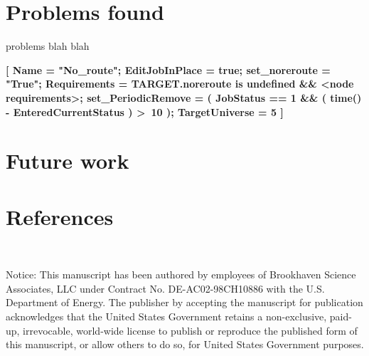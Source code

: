 \documentclass[a4paper]{jpconf}
\begin{document}
\section{Problems found}

problems blah blah

\begin{center}
    \colorbox{htcondorbox}{
        \begin{minipage}{\textwidth}
        \small
            \bf{[
                 Name = "No\_route";  \newline
                 EditJobInPlace = true; \newline
                 set\_noreroute = "True"; \newline
                 Requirements = TARGET.noreroute is undefined \&\& \textless node requirements\textgreater;  \newline
                 set\_PeriodicRemove = ( JobStatus == 1 \&\& ( time() - EnteredCurrentStatus ) \textgreater \ 10 ); \newline
                 TargetUniverse = 5 \newline
                 ]
            }
        \end{minipage}
    }
\end{center}

\section{Future work}




\section*{References}{}




~

Notice:
This manuscript has been authored by employees of Brookhaven Science Associates,
LLC under Contract No. DE-AC02-98CH10886 with the U.S. Department of Energy.
The publisher by accepting the manuscript for publication acknowledges
that the United States Government retains a non-exclusive, paid-up, irrevocable,
world-wide license to publish or reproduce the published form of this manuscript,
or allow others to do so, for United States Government purposes.
\end{document}
